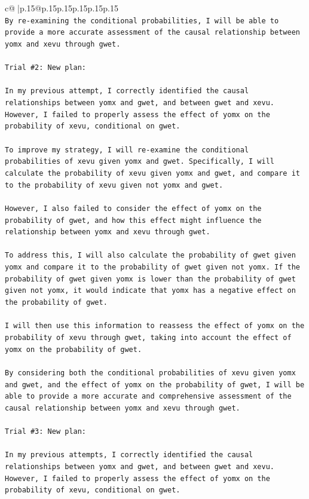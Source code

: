 \documentclass{article}
\begin{document}
{\begin{supertabular}{c@{$\;$}|p{.15\linewidth}@{}p{.15\linewidth}p{.15\linewidth}p{.15\linewidth}p{.15\linewidth}p{.15\linewidth}}
{{{\\ 
\texttt{By re{-}examining the conditional probabilities, I will be able to provide a more accurate assessment of the causal relationship between yomx and xevu through gwet.} \\
\\ 
\texttt{Trial \#2: New plan: } \\
\\ 
\texttt{In my previous attempt, I correctly identified the causal relationships between yomx and gwet, and between gwet and xevu. However, I failed to properly assess the effect of yomx on the probability of xevu, conditional on gwet. } \\
\\ 
\texttt{To improve my strategy, I will re{-}examine the conditional probabilities of xevu given yomx and gwet. Specifically, I will calculate the probability of xevu given yomx and gwet, and compare it to the probability of xevu given not yomx and gwet. } \\
\\ 
\texttt{However, I also failed to consider the effect of yomx on the probability of gwet, and how this effect might influence the relationship between yomx and xevu through gwet. } \\
\\ 
\texttt{To address this, I will also calculate the probability of gwet given yomx and compare it to the probability of gwet given not yomx. If the probability of gwet given yomx is lower than the probability of gwet given not yomx, it would indicate that yomx has a negative effect on the probability of gwet. } \\
\\ 
\texttt{I will then use this information to reassess the effect of yomx on the probability of xevu through gwet, taking into account the effect of yomx on the probability of gwet. } \\
\\ 
\texttt{By considering both the conditional probabilities of xevu given yomx and gwet, and the effect of yomx on the probability of gwet, I will be able to provide a more accurate and comprehensive assessment of the causal relationship between yomx and xevu through gwet.} \\
\\ 
\texttt{Trial \#3: New plan: } \\
\\ 
\texttt{In my previous attempts, I correctly identified the causal relationships between yomx and gwet, and between gwet and xevu. However, I failed to properly assess the effect of yomx on the probability of xevu, conditional on gwet. } \\
}}}
\end{supertabular}}
\end{document}
